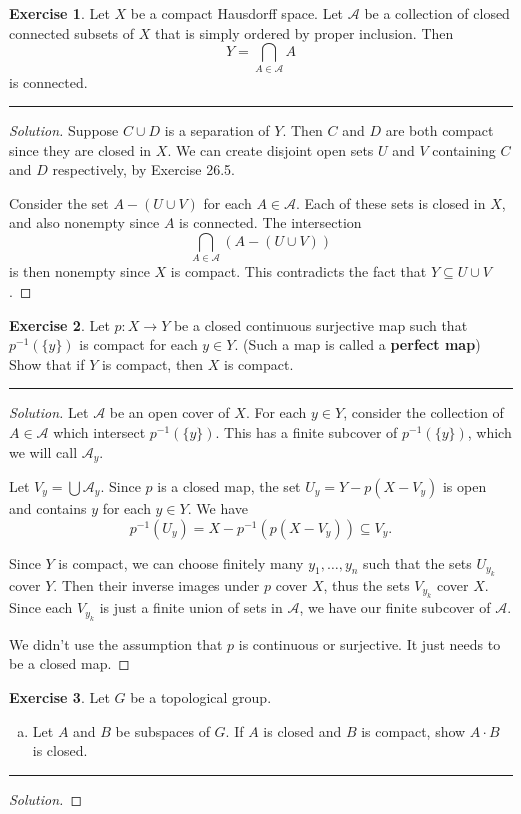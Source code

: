 \documentclass{article}
\theoremstyle{definition}
\newtheorem{exercise}{Exercise}[section]
\begin{document}
\pagebreak

\begin{exercise}
  Let $X$ be a compact Hausdorff space. Let $\mathcal{A}$ be a collection of closed connected subsets of $X$ that is simply ordered by proper inclusion. Then
  $$Y = \bigcap_{A\in\mathcal{A}}A$$
  is connected.
\end{exercise}
\hrule
\begin{proof}[Solution]
  Suppose $C\cup D$ is a separation of $Y$. Then $C$ and $D$ are both compact since they are closed in $X$. We can create disjoint open sets $U$ and $V$ containing $C$ and $D$ respectively, by Exercise 26.5.

  Consider the set $A - (U\cup V)$ for each $A\in\mathcal{A}$. Each of these sets is closed in $X$, and also nonempty since $A$ is connected. The intersection
  $$\bigcap_{A\in\mathcal{A}} (A - (U\cup V))$$
  is then nonempty since $X$ is compact. This contradicts the fact that $Y\subseteq U\cup V$.
\end{proof}

\pagebreak

\begin{exercise}
  Let $p:X\to Y$ be a closed continuous surjective map such that $p^{-1}(\{y\})$ is compact for each $y\in Y$. (Such a map is called a \textbf{perfect map}) Show that if $Y$ is compact, then $X$ is compact.
\end{exercise}
\hrule
\begin{proof}[Solution]
  Let $\mathcal{A}$ be an open cover of $X$. For each $y\in Y$, consider the collection of $A\in\mathcal{A}$ which intersect $p^{-1}(\{y\})$. This has a finite subcover of $p^{-1}(\{y\})$, which we will call $\mathcal{A}_y$.

  Let $V_y = \bigcup\mathcal{A}_y$.
  Since $p$ is a closed map, the set $U_y = Y - p(X - V_y)$ is open and contains $y$ for each $y\in Y$. We have
  $$p^{-1}(U_y) = X - p^{-1}(p(X-V_y)) \subseteq V_y.$$

  Since $Y$ is compact, we can choose finitely many $y_1,\dots,y_n$ such that the sets $U_{y_k}$ cover $Y$. Then their inverse images under $p$ cover $X$, thus the sets $V_{y_k}$ cover $X$. Since each $V_{y_k}$ is just a finite union of sets in $\mathcal{A}$, we have our finite subcover of $\mathcal{A}$.

  We didn't use the assumption that $p$ is continuous or surjective. It just needs to be a closed map.
\end{proof}

\pagebreak

\begin{exercise}
  Let $G$ be a topological group.
  \begin{enumerate}[(a)]
    \item Let $A$ and $B$ be subspaces of $G$. If $A$ is closed and $B$ is compact, show $A\cdot B$ is closed.
  \end{enumerate}
\end{exercise}
\hrule
\begin{proof}[Solution]
  
\end{proof}

\pagebreak
\end{document}
